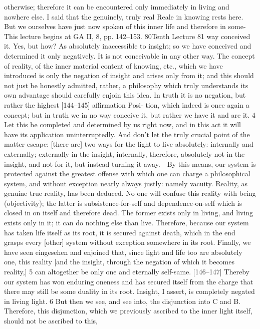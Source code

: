 otherwise; therefore it can be encountered only immediately in living and
nowhere else. I said that the genuinely, truly real {Reale} in knowing rests here.
But we ourselves have just now spoken of this inner life and therefore in some-
This lecture begins at GA II, 8, pp. 142–153.
80Tenth Lecture
81
way conceived it. Yes, but how? As absolutely inaccessible to insight; so we
have conceived and determined it only negatively. It is not conceivable in any
other way. The concept of reality, of the inner material content of knowing,
etc., which we have introduced is only the negation of insight and arises only
from it; and this should not just be honestly admitted, rather, a philosophy
which truly understands its own advantage should carefully enjoin this idea.
In truth it is no negation, but rather the highest [144–145] affirmation {Posi-
tion}, which indeed is once again a concept; but in truth we in no way conceive
it, but rather we have it and are it. 4
Let this be completed and determined by us right now, and in this act
it will have its application uninterruptedly. And don’t let the truly crucial
point of the matter escape: [there are] two ways for the light to live
absolutely: internally and externally; externally in the insight, internally,
therefore, absolutely not in the insight, and not for it, but instead turning it
away.—By this means, our system is protected against the greatest offense
with which one can charge a philosophical system, and without exception
nearly always justly: namely vacuity. Reality, as genuine true reality, has been
deduced. No one will confuse this reality with being (objectivity); the latter
is subsistence-for-self and dependence-on-self which is closed in on itself and
therefore dead. The former exists only in living, and living exists only in it; it
can do nothing else than live. Therefore, because our system has taken life
itself as its root, it is secured against death, which in the end grasps every
[other] system without exception somewhere in its root. Finally, we have seen
{eingesehen} and enjoined that, since light and life too are absolutely one, this
reality [and the insight, through the negation of which it becomes reality,] 5
can altogether be only one and eternally self-same. [146–147] Thereby our
system has won enduring oneness and has secured itself from the charge that
there may still be some duality in its root.
Insight, I assert, is completely negated in living light. 6 But then we see,
and see into, the disjunction into C and B. Therefore, this disjunction, which
we previously ascribed to the inner light itself, should not be ascribed to this,
